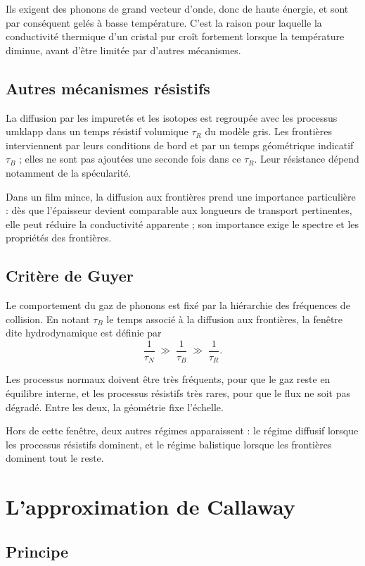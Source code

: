 \documentclass[11pt,a4paper]{article}
\begin{document}
Ils exigent des phonons de grand vecteur d'onde, donc de haute énergie, et sont par conséquent gelés
à basse température. C'est la raison pour laquelle la conductivité thermique d'un cristal pur croît
fortement lorsque la température diminue, avant d'être limitée par d'autres mécanismes.

\subsection{Autres mécanismes résistifs}

La diffusion par les impuretés et les isotopes est regroupée avec les processus umklapp dans
un temps résistif volumique $\tau_R$ du modèle gris. Les frontières interviennent par
leurs conditions de bord et par un temps géométrique indicatif $\tau_B$ ; elles ne sont
pas ajoutées une seconde fois dans ce $\tau_R$. Leur résistance dépend notamment de la spécularité.

Dans un film mince, la diffusion aux frontières prend une importance particulière : dès que
l'épaisseur devient comparable aux longueurs de transport pertinentes, elle peut réduire la
conductivité apparente ; son importance exige le spectre et les propriétés des frontières.

\subsection{Critère de Guyer}

Le comportement du gaz de phonons est fixé par la hiérarchie des fréquences de collision. En notant
$\tau_B$ le temps associé à la diffusion aux frontières, la fenêtre dite hydrodynamique est définie
par
\[ \frac{1}{\tau_N} \;\gg\; \frac{1}{\tau_B} \;\gg\; \frac{1}{\tau_R} . \]

Les processus normaux doivent être très fréquents, pour que le gaz reste en équilibre interne, et
les processus résistifs très rares, pour que le flux ne soit pas dégradé. Entre les deux, la
géométrie fixe l'échelle.

Hors de cette fenêtre, deux autres régimes apparaissent : le régime diffusif lorsque les processus
résistifs dominent, et le régime balistique lorsque les frontières dominent tout le reste.

\section{L'approximation de Callaway}

\subsection{Principe}
\end{document}
